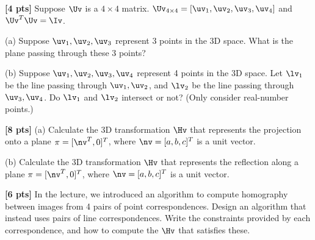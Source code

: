 \documentclass[11pt]{exam}
\numberwithin{equation}{section} %
\numberwithin{figure}{section} %
\numberwithin{table}{section} %
\begin{document}
\begin{questions}
\begin{tcolorbox}[height fill, width=\textwidth, blank, borderline={0.5pt}{-2pt},halign=left, valign=top, nobeforeafter, size=normal]
    \end{tcolorbox}

    \question \textbf{[4 pts]} Suppose $\Uv$ is a $4\times 4$ matrix. $\Uv_{4 \times 4} = [\uv_1, \uv_2, \uv_3, \uv_4]$ and $\Uv^T\Uv = \Iv$.

    (a) Suppose $\uv_1, \uv_2, \uv_3$ represent 3 points in the 3D space. What is the plane passing through these 3 points?

    (b) Suppose $\uv_1, \uv_2, \uv_3, \uv_4$ represent 4 points in the 3D space. Let $\lv_1$ be the line passing through $\uv_1, \uv_2$, and $\lv_2$ be the line passing through $\uv_3, \uv_4$. Do $\lv_1$ and $\lv_2$ intersect or not? (Only consider real-number points.)

    \begin{tcolorbox}[height fill, width=\textwidth, blank, borderline={0.5pt}{-2pt},halign=left, valign=top, nobeforeafter, size=normal]

    \end{tcolorbox}

    \question \textbf{[8 pts]} (a) Calculate the 3D transformation $\Hv$ that represents the projection onto a plane $\pi = [\nv^T, 0]^T$, where $\nv = [a,b,c]^T$ is a unit vector.

    (b) Calculate the 3D transformation $\Hv$ that represents the reflection along a plane $\pi = [\nv^T, 0]^T$, where $\nv = [a,b,c]^T$ is a unit vector.

    \begin{tcolorbox}[height fill, width=\textwidth, blank, borderline={0.5pt}{-2pt},halign=left, valign=top, nobeforeafter, size=normal]

    \end{tcolorbox}

    \question \textbf{[6 pts]} In the lecture, we introduced an algorithm to compute homography between images from 4 pairs of point correspondences. Design an algorithm that instead uses pairs of line correspondences. Write the constraints provided by each correspondence, and how to compute the $\Hv$ that satisfies these.

    \begin{tcolorbox}[height fill, width=\textwidth, blank, borderline={0.5pt}{-2pt},halign=left, valign=top, nobeforeafter, size=normal]

    \end{tcolorbox}

\end{questions}
\end{document}
